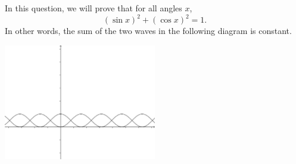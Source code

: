 \documentclass{exam}
\begin{document}
\begin{questions}
\question In this question, we will prove that for all angles $ x $,
          \begin{displaymath}
            (\sin x)^2 + (\cos x)^2 = 1.
          \end{displaymath}
          In other words, the sum of the two waves in the following diagram is constant.
          \begin{center}
            \includegraphics[width=0.5\textwidth]{pythagsine}
          \end{center}


\end{questions}
\end{document}
